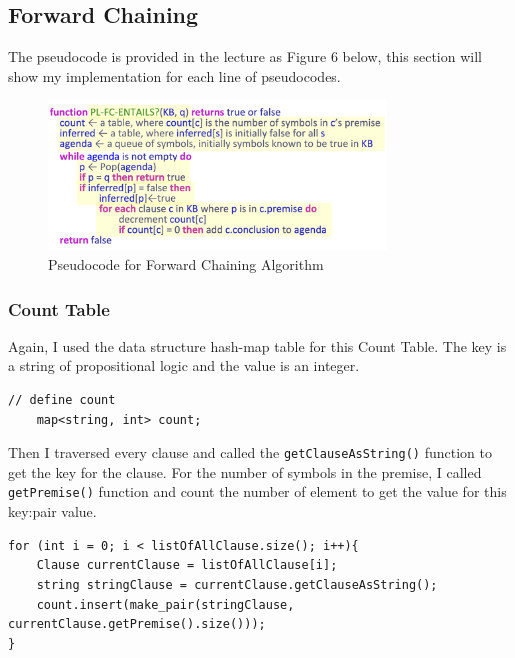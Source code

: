 \documentclass{assignment}
\begin{document}
\newpage
\subsection{Forward Chaining}

The pseudocode is provided in the lecture as Figure 6 below, this section will show my implementation for each line of pseudocodes.

\begin{figure}[h]
    \centering
    \includegraphics[width=0.8\textwidth]{./assets/FCpseu.png}
    \caption{Pseudocode for Forward Chaining Algorithm}
    \label{fig:fig5}
\end{figure}

\subsubsection{Count Table}

Again, I used the data structure hash-map table for this Count Table. The key is a string of propositional logic and the value is an integer.

\lstset{language=C++}
\begin{lstlisting}[caption={Define Count Table}]
	// define count
    map<string, int> count;
\end{lstlisting}

Then I traversed every clause and called the \texttt{getClauseAsString()} function to get the key for the clause. For the number of symbols in the premise, I called \texttt{getPremise()} function and count the number of element to get the value for this key:pair value.

\lstset{language=C++}
\begin{lstlisting}[caption={Initialize Count Table}]
for (int i = 0; i < listOfAllClause.size(); i++){
	Clause currentClause = listOfAllClause[i];
    string stringClause = currentClause.getClauseAsString();
    count.insert(make_pair(stringClause, currentClause.getPremise().size()));
}
\end{lstlisting}
\end{document}
